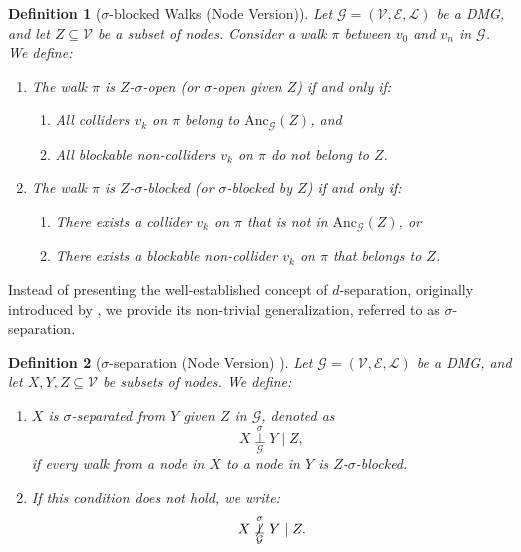 \documentclass[accepted]{uai2025} %
\newtheorem{definition}{Definition}
\newcommand{\anc}{\text{Anc}}
\begin{document}
\begin{definition}[$\sigma$-blocked Walks (Node Version)]  
Let \( \mathcal{G} = (\mathcal{V},\mathcal{E},\mathcal{L}) \) be a DMG, and let \( Z \subseteq \mathcal{V} \) be a subset of nodes. Consider a walk \( \pi \) between \( v_0 \) and \( v_n \) in \( \mathcal{G} \). We define:  
\begin{enumerate}  
    \item The walk \( \pi \) is \emph{\( Z \)-\( \sigma \)-open} (or \emph{\( \sigma \)-open given \( Z \)}) if and only if:  
    \begin{enumerate}  
        \item All colliders \( v_k \) on \( \pi \) belong to \( \anc_\mathcal{G}(Z) \), and  
        \item All blockable non-colliders \( v_k \) on \( \pi \) do not belong to \( Z \).  
    \end{enumerate}  
    \item The walk \( \pi \) is \emph{\( Z \)-\( \sigma \)-blocked} (or \emph{\( \sigma \)-blocked by \( Z \)}) if and only if:  
    \begin{enumerate}  
        \item There exists a collider \( v_k \) on \( \pi \) that is not in \( \anc_\mathcal{G}(Z) \), or
        \item There exists a blockable non-collider \( v_k \) on \( \pi \) that belongs to \( Z \).  
    \end{enumerate}  
\end{enumerate}  
\end{definition}

Instead of presenting the well-established concept of $d$-separation, originally introduced by \citet{pearl1985constraint}, we provide its non-trivial generalization, referred to as $\sigma$-separation.

\begin{definition}[$\sigma$-separation (Node Version) \citep{forre2017markov}] \label{sigma separation}
Let \( \mathcal{G} = (\mathcal{V},\mathcal{E},\mathcal{L}) \) be a DMG, and let \( X, Y, Z \subseteq \mathcal{V} \) be subsets of nodes. We define:  
\begin{enumerate}  
    \item \( X \) is \emph{\(\sigma\)-separated from \( Y \) given \( Z \) in \( \mathcal{G} \)}, denoted as  
    \[
    X\overset{\sigma}{\underset{\mathcal{G}}{\perp}}Y \mid Z,
    \]  
    if every walk from a node in \( X \) to a node in \( Y \) is \( Z \)-\( \sigma \)-blocked.  
    \item If this condition does not hold, we write:  
    \[
    X\not\overset{\sigma}{\underset{\mathcal{G}}{\perp}}Y \mid Z.
    \]  
\end{enumerate}  
\end{definition}
\end{document}
